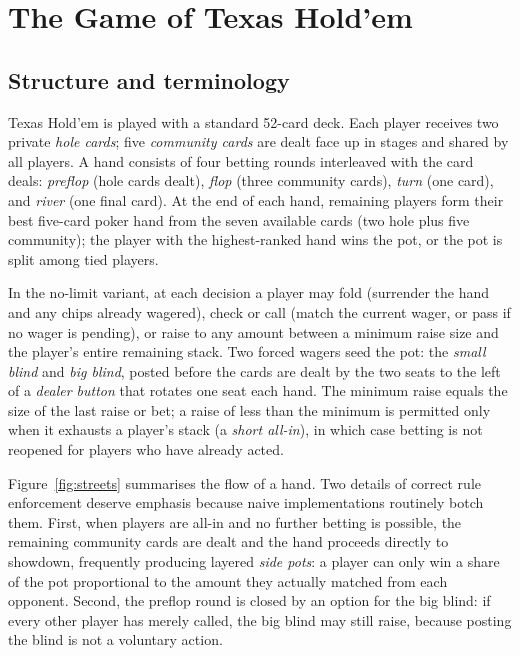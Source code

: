 \section{The Game of Texas Hold'em}\label{sec:game}

\subsection{Structure and terminology}

Texas Hold'em is played with a standard 52-card deck. Each player receives two private \emph{hole cards}; five \emph{community cards} are dealt face up in stages and shared by all players. A hand consists of four betting rounds interleaved with the card deals: \emph{preflop} (hole cards dealt), \emph{flop} (three community cards), \emph{turn} (one card), and \emph{river} (one final card). At the end of each hand, remaining players form their best five-card poker hand from the seven available cards (two hole plus five community); the player with the highest-ranked hand wins the pot, or the pot is split among tied players.

In the no-limit variant, at each decision a player may fold (surrender the hand and any chips already wagered), check or call (match the current wager, or pass if no wager is pending), or raise to any amount between a minimum raise size and the player's entire remaining stack. Two forced wagers seed the pot: the \emph{small blind} and \emph{big blind}, posted before the cards are dealt by the two seats to the left of a \emph{dealer button} that rotates one seat each hand. The minimum raise equals the size of the last raise or bet; a raise of less than the minimum is permitted only when it exhausts a player's stack (a \emph{short all-in}), in which case betting is not reopened for players who have already acted.

Figure~\ref{fig:streets} summarises the flow of a hand. Two details of correct rule enforcement deserve emphasis because naive implementations routinely botch them. First, when players are all-in and no further betting is possible, the remaining community cards are dealt and the hand proceeds directly to showdown, frequently producing layered \emph{side pots}: a player can only win a share of the pot proportional to the amount they actually matched from each opponent. Second, the preflop round is closed by an option for the big blind: if every other player has merely called, the big blind may still raise, because posting the blind is not a voluntary action.

